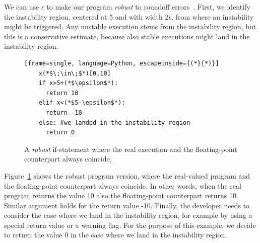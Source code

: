 We can use $\epsilon$ to make our program \emph{robust} to roundoff errors~\cite{guardstable}.
%
First, we identify the instability region, centered at 5 and with width $2\epsilon$, from where an instability might be triggered.
%
Any unstable execution stems from the instability region, but this is a conservative estimate, because also stable executions might land in the instability region.
%
\begin{figure}[b!]
	\begin{lstlisting}[frame=single, language=Python, escapeinside={(*}{*)}]
	x(*$\;\in\;$*)[0,10]
	if x>5+(*$\epsilon$*):
	  return 10
	elif x<(*$5-\epsilon$*):
	  return -10
	else: #we landed in the instability region
	  return 0
	\end{lstlisting}
	\caption{A \emph{robust} if-statement where the real execution and the floating-point counterpart always coincide.}
	\label{fig:ifrobust}
\end{figure}
%
Figure~\ref{fig:ifrobust} shows the robust program version, where the real-valued program and the floating-point counterpart always coincide. 
%
In other words, when the real program returns the value 10 also the floating-point counterpart returns 10. Similar argument holds for the return value -10.
%
Finally, the developer needs to consider the case where we land in the instability region, for example by using a special return value or a warning flag.
%
For the purpose of this example, we decide to return the value $0$ in the case where we land in the instability region. 

%

